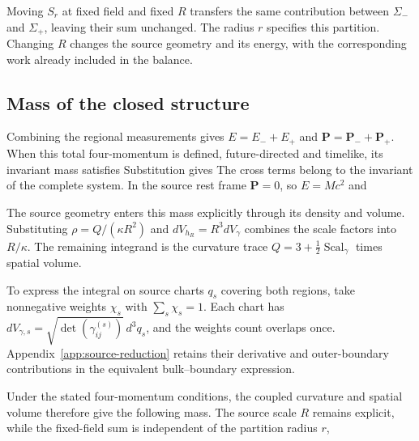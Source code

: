 Moving $S_r$ at fixed field and fixed $R$ transfers the same contribution between $\Sigma_-$ and $\Sigma_+$, leaving their sum unchanged. The radius $r$ specifies this partition. Changing $R$ changes the source geometry and its energy, with the corresponding work already included in the balance.

\subsection{Mass of the closed structure}
Combining the regional measurements gives $E=E_-+E_+$ and $\mathbf P=\mathbf P_-+\mathbf P_+$. When this total four-momentum is defined, future-directed and timelike, its invariant mass satisfies
\EnergyTotalMassRelationDisplay
Substitution gives
\ClosedRegionalMassDisplay
The cross terms belong to the invariant of the complete system. In the source rest frame $\mathbf P=0$, so $E=Mc^2$ and
\ClosedInteriorAccountingDisplay

The source geometry enters this mass explicitly through its density and volume. Substituting $\rho=Q/(\kappa R^2)$ and $dV_{h_R}=R^3dV_\gamma$ combines the scale factors into $R/\kappa$. The remaining integrand is the curvature trace $Q=3+\tfrac12\operatorname{Scal}_\gamma$ times spatial volume.

To express the integral on source charts $q_s$ covering both regions, take nonnegative weights $\chi_s$ with $\sum_s\chi_s=1$. Each chart has $dV_{\gamma,s}=\sqrt{\det(\gamma_{ij}^{(s)})}\,d^3q_s$, and the weights count overlaps once. Appendix~\ref{app:source-reduction} retains their derivative and outer-boundary contributions in the equivalent bulk--boundary expression.

Under the stated four-momentum conditions, the coupled curvature and spatial volume therefore give the following mass. The source scale $R$ remains explicit, while the fixed-field sum is independent of the partition radius $r$,
\ClosedSourceMassDisplay
